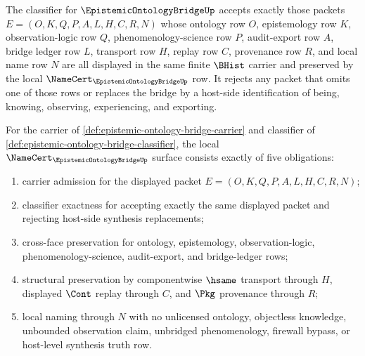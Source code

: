 \begin{definition}
\label{def:epistemic-ontology-bridge-classifier}
The classifier for $\EpistemicOntologyBridgeUp$ accepts exactly those packets $E=(O,K,Q,P,A,L,H,C,R,N)$ whose ontology row $O$, epistemology row $K$, observation-logic row $Q$, phenomenology-science row $P$, audit-export row $A$, bridge ledger row $L$, transport row $H$, replay row $C$, provenance row $R$, and local name row $N$ are all displayed in the same finite $\BHist$ carrier and preserved by the local $\NameCert_{\EpistemicOntologyBridgeUp}$ row. It rejects any packet that omits one of those rows or replaces the bridge by a host-side identification of being, knowing, observing, experiencing, and exporting.
\end{definition}

\begin{theorem}
\label{thm:epistemic-ontology-bridge-namecert-obligations}
For the carrier of \autoref{def:epistemic-ontology-bridge-carrier} and classifier of \autoref{def:epistemic-ontology-bridge-classifier}, the local $\NameCert_{\EpistemicOntologyBridgeUp}$ surface consists exactly of five obligations:
\begin{enumerate}
\item carrier admission for the displayed packet $E=(O,K,Q,P,A,L,H,C,R,N)$;
\item classifier exactness for accepting exactly the same displayed packet and rejecting host-side synthesis replacements;
\item cross-face preservation for ontology, epistemology, observation-logic, phenomenology-science, audit-export, and bridge-ledger rows;
\item structural preservation by componentwise $\hsame$ transport through $H$, displayed $\Cont$ replay through $C$, and $\Pkg$ provenance through $R$;
\item local naming through $N$ with no unlicensed ontology, objectless knowledge, unbounded observation claim, unbridged phenomenology, firewall bypass, or host-level synthesis truth row.
\end{enumerate}
\end{theorem}
